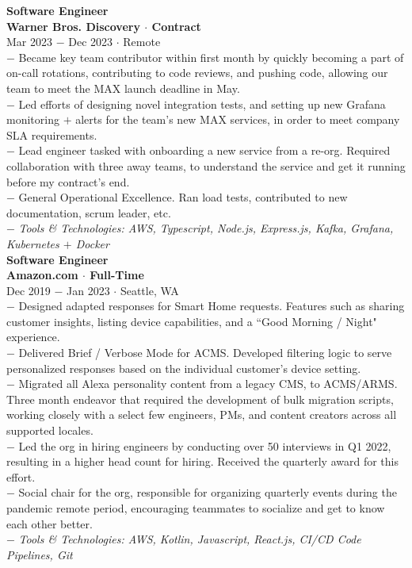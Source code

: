 \documentclass{resume}
\begin{document}
\begin{flushleft}
\normalsize{\bf Software Engineer}\\
\footnotesize{\bf Warner Bros. Discovery $\cdot$ Contract}\\
\footnotesize{Mar 2023 $-$ Dec 2023 $\cdot$ Remote}\\[1mm]
{\scriptsize
	$-$ Became key team contributor within first month by quickly becoming a part of on-call rotations, contributing to code reviews, and pushing code, allowing our team to meet the MAX launch deadline in May.\\
	$-$ Led efforts of designing novel integration tests, and setting up new Grafana monitoring $+$ alerts for the team's new MAX services, in order to meet company SLA requirements.\\
	$-$ Lead engineer tasked with onboarding a new service from a re-org. Required collaboration with three away teams, to understand the service and get it running before my contract's end.\\
	$-$ General Operational Excellence. Ran load tests, contributed to new documentation, scrum leader, etc.\\
	$-$ \textit{Tools \& Technologies: AWS, Typescript, Node.js, Express.js, Kafka, Grafana, Kubernetes $+$ Docker}
}\\[3mm]

\normalsize{\bf Software Engineer}\\
\footnotesize{\bf Amazon.com $\cdot$ Full-Time}\\
\footnotesize{Dec 2019 $-$ Jan 2023 $\cdot$ Seattle, WA}\\[1mm]
{\scriptsize
	$-$ Designed adapted responses for Smart Home requests. Features such as sharing customer insights, listing device capabilities, and a ``Good Morning / Night" experience. \\
	$-$ Delivered Brief / Verbose Mode for ACMS. Developed filtering logic to serve personalized responses based on the individual customer's device setting. \\
	$-$ Migrated all Alexa personality content from a legacy CMS, to ACMS/ARMS. Three month endeavor that required the development of bulk migration scripts, working closely with a select few engineers, PMs, and content creators across all supported locales. \\
	$-$ Led the org in hiring engineers by conducting over 50 interviews in Q1 2022, resulting in a higher head count for hiring. Received the quarterly award for this effort. \\
	$-$ Social chair for the org, responsible for organizing quarterly events during the pandemic remote period, encouraging teammates to socialize and get to know each other better. \\
	$-$ \textit{Tools \& Technologies: AWS, Kotlin, Javascript, React.js, CI/CD Code Pipelines, Git}
}\\[3mm]


\end{flushleft}
\end{document}
